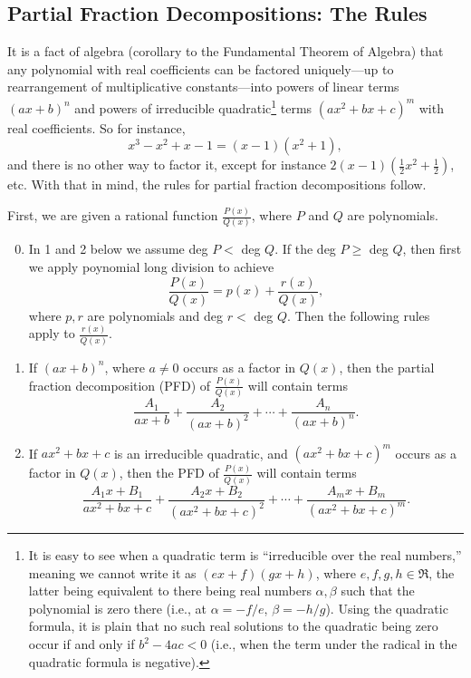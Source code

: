 \subsection{Partial Fraction Decompositions: The Rules
\label{RulesForPDFSubsection}}

It is a fact of algebra (corollary to the Fundamental
Theorem of Algebra) that any polynomial with real coefficients can be 
factored uniquely---up to rearrangement of 
multiplicative constants---into powers of linear terms $(ax+b)^n$
and powers of irreducible quadratic\footnote{%
It is easy to see when a quadratic term is ``irreducible
over the real numbers,'' meaning we cannot write
it as $(ex+f)(gx+h)$, where $e,f,g,h\in\Re$, the latter being
equivalent to there being real numbers $\alpha,\beta$
such that the polynomial is zero there
(i.e., at $\alpha=-f/e$, $\beta=-h/g$). Using the quadratic formula,
it is plain that no such real solutions to the quadratic being
zero occur if and only if $b^2-4ac<0$ (i.e., when the term under the
radical in the quadratic formula is negative).}
terms $(ax^2+bx+c)^m$ with real coefficients.  So for instance, 
$$x^3-x^2+x-1=(x-1)(x^2+1),$$
and there is no other way to factor it, except for 
instance $2(x-1)(\frac12x^2+\frac12)$, etc.
With that in mind, the rules for partial fraction decompositions
follow.

First, we are given a rational function $\frac{P(x)}{Q(x)}$,
where $P$ and $Q$ are polynomials.
\begin{enumerate}\setcounter{enumi}{-1}
\item In 1 and 2 below we assume deg $P <$ deg $Q$.
      If the deg $P \ge$ deg $Q$, then first we apply
      poynomial long division to achieve
      $$\frac{P(x)}{Q(x)}=p(x)+\frac{r(x)}{Q(x)},$$
      where $p,r$ are polynomials and deg $r <$ deg $Q$.
      Then the following rules apply to $\frac{r(x)}{Q(x)}$.
\item If $(ax+b)^n$, where $a\ne0$ occurs as a factor in $Q(x)$, then
      the partial fraction decomposition (PFD) of $\frac{P(x)}{Q(x)}$
      will contain terms
      $$\frac{A_1}{ax+b}+\frac{A_2}{(ax+b)^2}+\cdots+\frac{A_n}{(ax+b)^n}.$$
\item If $ax^2+bx+c$ is an irreducible quadratic, and
      $(ax^2+bx+c)^m$ occurs as a factor in $Q(x)$, then
      the PFD of  $\frac{P(x)}{Q(x)}$ will contain terms
      $$\frac{A_1x+B_1}{ax^2+bx+c}
          +\frac{A_2x+B_2}{(ax^2+bx+c)^2}
          +\cdots+\frac{A_mx+B_m}{(ax^2+bx+c)^m}.$$
\end{enumerate}

